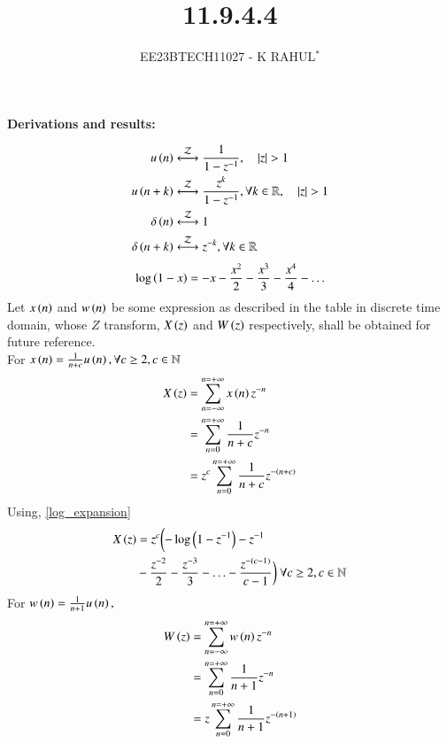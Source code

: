 \documentclass[journal,12pt,twocolumn]{IEEEtran}
\theoremstyle{remark}
\begin{document}

\vspace{3cm}
\title{11.9.4.4}
\author{EE23BTECH11027 - K RAHUL$^{*}$%
}
\maketitle
\newpage
\bigskip
\renewcommand{\thefigure}{\theenumi}
\renewcommand{\thetable}{\theenumi}
\textbf{Derivations and results:} \\
\begin{table}[ht]

\end{table}
\begin{align}
	u\brak{n} &\system{Z} \frac{1}{1-z^{-1}} , \quad \abs{z} > 1\\
	u\brak{n+k} &\system{Z} \frac{z^k}{1-z^{-1}}, \forall k\in \mathbb{R}, \quad \abs{z} > 1  \label{Z_trans_pair}\\
	\delta\brak{n} &\system{Z} 1 \\
	\delta\brak{n+k} &\system{Z}z^{-k} ,\forall k\in \mathbb{R} \label{11027_eq2}
\end{align}
\begin{align}
        \log\left(1-x\right) = -x - \frac{x^2}{2} - \frac{x^3}{3}-\frac{x^4}{4}- \ldots \label{log_expansion}
\end{align}
Let $x\left(n\right)$ and $w\left(n\right)$ be some expression as described in the table in discrete time domain, whose $Z$ transform, $X\left(z\right)$ and $W\left(z\right)$ respectively, shall be obtained for future reference.\\
For  $x\left(n\right) = \frac{1}{n+c} u\left(n\right),\forall c \geq 2,c \in \mathbb{N}$
\begin{align}
    X\left(z\right) &= \sum_{n= -\infty}^{n= +\infty} x\left(n\right)z^{-n}\\
    &=\sum_{n = 0}^{n = +\infty} \frac{1}{n+c}z^{-n}\\
    &= z^c\sum_{n = 0}^{n = +\infty} \frac{1}{n+c}z^{-\left(n+c\right)}
\end{align}
Using, \eqref{log_expansion}
\begin{align}
    X\left(z\right)&= z^c \biggl(-\log\left(1-z^{-1}\right)- z^{-1}\notag\\& -\frac{z^{-2}}{2}-\frac{z^{-3}}{3} - \ldots -\frac{z^{-(c-1)}}{c-1} \biggr)\ \forall c \geq 2, c \in \mathbb{N} \label{11027_eq1}
\end{align} 
For $w\left(n\right) = \frac{1}{n+1}u\left(n\right),$\\
\begin{align}
	W\left(z\right) &=\sum_{n= -\infty}^{n= +\infty} w\left(n\right)z^{-n}\\
	&= \sum_{n = 0}^{n = +\infty} \frac{1}{n+1}z^{-n}\\
	&= z\sum_{n = 0}^{n = +\infty} \frac{1}{n+1}z^{-\left(n+1\right)} 
\end{align}
\end{document}
